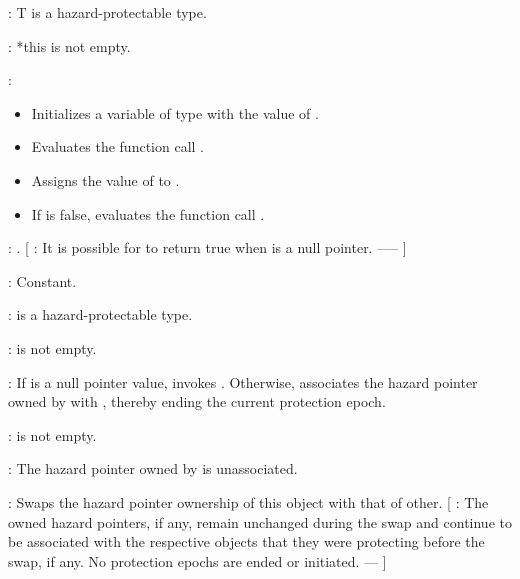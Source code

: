 
\pnum
{}: T is a hazard-protectable type.

\pnum
{}: *this is not empty.

\pnum
{}:
\begin{itemize}
\item Initializes a variable  of type  with the value of .
\item Evaluates the function call .
\item Assigns the value of  to .
\item If  is false, evaluates the function call .
\end{itemize}

\pnum
{}: . [ : It is possible for  to return true when  is a null pointer. --—  ]

\pnum
{}: Constant.
\\


\pnum
{}:  is a hazard-protectable type.

\pnum
{}:  is not empty.

\pnum
{}: If  is a null pointer value, invokes . Otherwise, associates the hazard pointer owned by  with , thereby ending the current protection epoch.
\\


\pnum
{}:  is not empty.

\pnum
{}: The hazard pointer owned by  is unassociated.
\\


\pnum
{}: Swaps the hazard pointer ownership of this object with that of other. [ : The owned hazard pointers, if any, remain unchanged during the swap and continue to be associated with the respective objects that they were protecting before the swap, if any. No protection epochs are ended or initiated. —  ]

